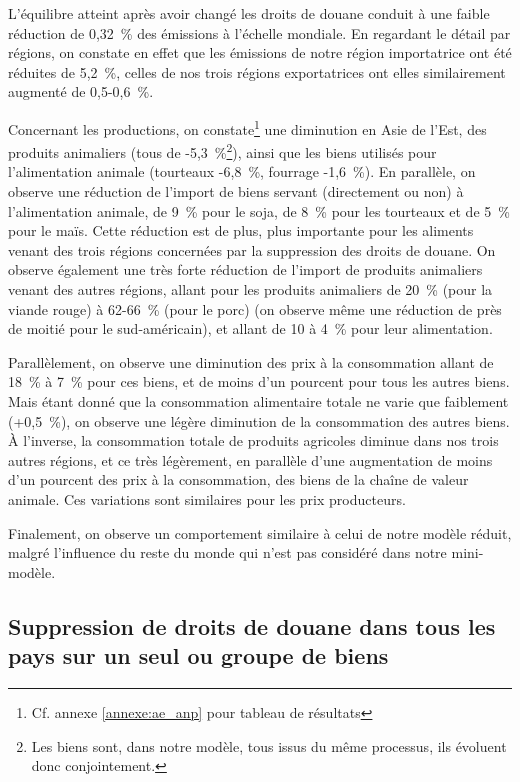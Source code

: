 L'équilibre atteint après avoir changé les droits de douane conduit à une faible réduction de 0,32~\% des émissions à l'échelle mondiale. En regardant le détail par régions, on constate en effet que les émissions de notre région importatrice ont été réduites de 5,2~\%, celles de nos trois régions exportatrices ont elles similairement augmenté de 0,5-0,6~\%.

Concernant les productions, on constate\footnote{Cf. annexe \ref{annexe:ae_anp} pour tableau de résultats} une diminution en Asie de l'Est, des produits animaliers (tous de -5,3~\%\footnote{Les biens sont, dans notre modèle, tous issus du même processus, ils évoluent donc conjointement.}), ainsi que les biens utilisés pour l'alimentation animale (tourteaux -6,8~\%, fourrage -1,6~\%). En parallèle, on observe une réduction de l'import de biens servant (directement ou non) à l'alimentation animale, de 9~\% pour le soja, de 8~\% pour les tourteaux et de 5~\% pour le maïs. Cette réduction est de plus, plus importante pour les aliments venant des trois régions concernées par la suppression des droits de douane. On observe également une très forte réduction de l'import de produits animaliers venant des autres régions, allant pour les produits animaliers de 20~\% (pour la viande rouge) à 62-66~\% (pour le porc) (on observe même une réduction de près de moitié pour le sud-américain), et allant de 10 à 4~\% pour leur alimentation.

Parallèlement, on observe une diminution des prix à la consommation allant de 18~\% à 7~\% pour ces biens, et de moins d'un pourcent pour tous les autres biens. Mais étant donné que la consommation alimentaire totale ne varie que faiblement (+0,5~\%), on observe une légère diminution de la consommation des autres biens. À l'inverse, la consommation totale de produits agricoles diminue dans nos trois autres régions, et ce très légèrement, en parallèle d'une augmentation de moins d'un pourcent des prix à la consommation, des biens de la chaîne de valeur animale. Ces variations sont similaires pour les prix producteurs.

Finalement, on observe un comportement similaire à celui de notre modèle réduit, malgré l'influence du reste du monde qui n'est pas considéré dans notre mini-modèle.


\subsection{Suppression de droits de douane dans tous les pays sur un seul ou groupe de biens}

